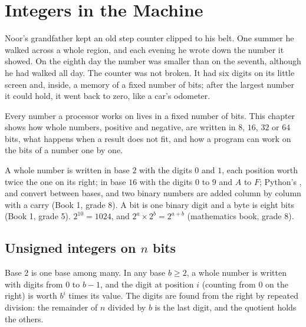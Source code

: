 \chapter{Integers in the Machine}\label{ch:g10:machine-integers}

Noor's grandfather kept an old step counter clipped to his belt. One summer he walked across a whole region, and
each evening he wrote down the number it showed. On the eighth day the number was smaller than on the seventh,
although he had walked all day. The counter was not broken. It had six digits on its little screen and, inside, a
memory of a fixed number of bits; after the largest number it could hold, it went back to zero, like a car's
odometer.

Every number a processor works on lives in a fixed number of bits. This chapter shows how whole numbers, positive
and negative, are written in $8$, $16$, $32$ or $64$ bits, what happens when a result does not fit, and how a
program can work on the bits of a number one by one.

\begin{recall}
A whole number is written in base $2$ with the digits $0$ and $1$, each position worth twice the one on its right;
in base $16$ with the digits $0$ to $9$ and $A$ to $F$; Python's ,  and 
convert between bases, and two binary numbers are added column by column with a carry (Book 1, grade 8). A bit
is one binary digit and a byte is eight bits (Book 1, grade 5). $2^{10} = 1024$, and $2^{a} \times 2^{b} =
2^{a+b}$ (mathematics book, grade 8).
\end{recall}

\section{Unsigned integers on \texorpdfstring{$n$}{n} bits}\label{sec:g10:machine-integers:unsigned}

Base $2$ is one base among many. In any base $b \ge 2$, a whole number is written with digits from $0$ to $b - 1$,
and the digit at position $i$ (counting from $0$ on the right) is worth $b^i$ times its value. The digits are found
from the right by repeated division: the remainder of $n$ divided by $b$ is the last digit, and the quotient holds
the others.

